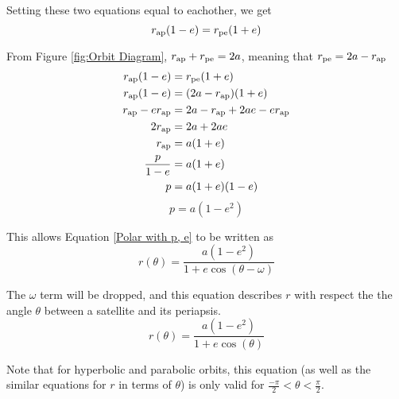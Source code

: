 \documentclass[../basicOrbitalDynamics.tex]{subfiles}
\begin{document}
Setting these two equations equal to eachother, we get
\[{r}_\text{ap}(1-e)={r}_\text{pe}(1+e)\]

From Figure \ref{fig:Orbit Diagram}, ${r}_\text{ap}+{r}_\text{pe}=2a$, meaning that ${r}_\text{pe}=2a-{r}_\text{ap}$
\begin{align*}
    {r}_\text{ap}(1-e)         & ={r}_\text{pe}(1+e)                \\
    {r}_\text{ap}(1-e)         & =(2a-{r}_\text{ap})(1+e)           \\
    {r}_\text{ap}-e{r}_\text{ap} & =2a-{r}_\text{ap}+2ae-e{r}_\text{ap} \\
    2{r}_\text{ap}             & =2a+2ae                          \\
    {r}_\text{ap}              & =a(1+e)                          \\
    \frac{p}{1-e}            & =a(1+e)                          \\
    p                        & =a(1+e)(1-e)                     \\
\end{align*}
\begin{equation}\label{SLR a and e}
    p=a(1-e^2)
\end{equation}

This allows Equation \eqref{Polar with p, e} to be written as
\begin{equation*}
    r(\theta)=\frac{a(1-e^2)}{1+e\cos(\theta-\omega)}
\end{equation*}

The $\omega$ term will be dropped, and this equation describes $r$ with respect the the angle $\theta$ between a satellite and its periapsis.
\begin{equation}\label{Polar Final}
    r(\theta)=\frac{a(1-e^2)}{1+e\cos(\theta)}
\end{equation}

Note that for hyperbolic and parabolic orbits, this equation (as well as the similar equations for $r$ in terms of $\theta$) is only valid for $\frac{-\pi}{2}<\theta<\frac{\pi}{2}$.
\end{document}
